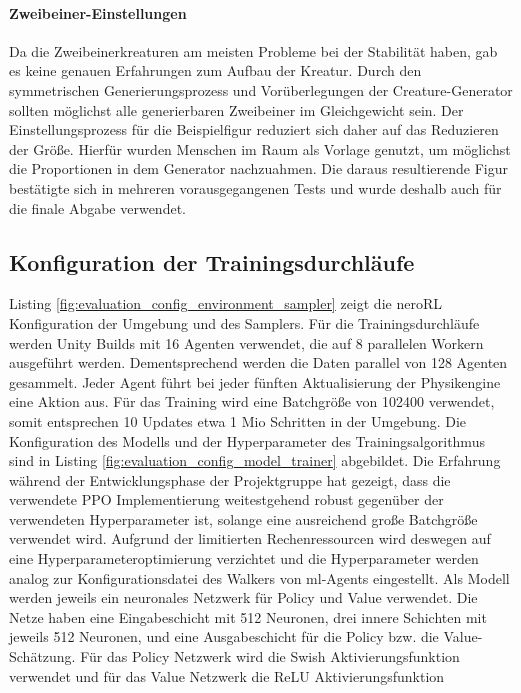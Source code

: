 \paragraph{Zweibeiner-Einstellungen}
Da die Zweibeinerkreaturen am meisten Probleme bei der Stabilität haben, gab es keine genauen Erfahrungen zum Aufbau der Kreatur. Durch den symmetrischen Generierungsprozess und Vorüberlegungen der Creature-Generator sollten möglichst alle generierbaren Zweibeiner im Gleichgewicht sein. Der Einstellungsprozess für die Beispielfigur reduziert sich daher auf das Reduzieren der Größe. Hierfür wurden Menschen im Raum als Vorlage genutzt, um möglichst die Proportionen in dem Generator nachzuahmen. Die daraus resultierende Figur bestätigte sich in mehreren vorausgegangenen Tests und wurde deshalb auch für die finale Abgabe verwendet.

\subsection{Konfiguration der Trainingsdurchläufe}
Listing \ref{fig:evaluation_config_environment_sampler} zeigt die neroRL Konfiguration der Umgebung und des Samplers. Für die Trainingsdurchläufe werden Unity Builds mit 16 Agenten verwendet, die auf 8 parallelen Workern ausgeführt werden. Dementsprechend werden die Daten parallel von 128 Agenten gesammelt. Jeder Agent führt bei jeder fünften Aktualisierung der Physikengine eine Aktion aus. Für das Training wird eine Batchgröße von 102400 verwendet, somit entsprechen 10 Updates etwa 1 Mio Schritten in der Umgebung.
Die Konfiguration des Modells und der Hyperparameter des Trainingsalgorithmus sind in Listing \ref{fig:evaluation_config_model_trainer} abgebildet. Die Erfahrung während der Entwicklungsphase der Projektgruppe hat gezeigt, dass die verwendete PPO Implementierung weitestgehend robust gegenüber der verwendeten Hyperparameter ist, solange eine ausreichend große Batchgröße verwendet wird. Aufgrund der limitierten Rechenressourcen wird deswegen auf eine Hyperparameteroptimierung verzichtet und die Hyperparameter werden analog zur Konfigurationsdatei des Walkers von ml-Agents eingestellt.
Als Modell werden jeweils ein neuronales Netzwerk für Policy und Value verwendet. Die Netze haben eine Eingabeschicht mit 512 Neuronen, drei innere Schichten mit jeweils 512 Neuronen, und eine Ausgabeschicht für die Policy bzw. die Value-Schätzung. Für das Policy Netzwerk wird die Swish Aktivierungsfunktion verwendet und für das Value Netzwerk die ReLU Aktivierungsfunktion

